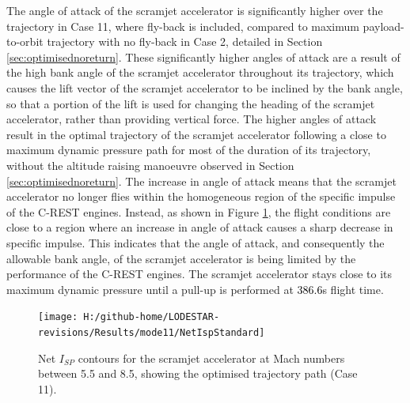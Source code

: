 The angle of attack of the scramjet accelerator is significantly higher over the trajectory in Case 11, where fly-back is included, compared to maximum payload-to-orbit trajectory with no fly-back in Case 2, detailed in Section \ref{sec:optimisednoreturn}. These significantly  higher angles of attack are a result of the high bank angle of the scramjet accelerator throughout its trajectory, which causes the lift vector of the scramjet accelerator to be inclined by the bank angle, so that a portion of the lift is used for changing the heading of the scramjet accelerator, rather than providing vertical force. 
 The higher angles of attack result in the optimal trajectory of the scramjet accelerator following a close to maximum dynamic pressure path for most of the duration of its trajectory, without the altitude raising manoeuvre observed in Section \ref{sec:optimisednoreturn}.
 The increase in angle of attack means that the scramjet accelerator no longer flies within the homogeneous region of the specific impulse of the C-REST engines. Instead, as shown in Figure \ref{fig:NetIspStandard}, the flight conditions are close to a region where an increase in angle of attack causes a sharp decrease in specific impulse. 
This indicates that the angle of attack, and consequently the allowable bank angle, of the scramjet accelerator is being limited by the performance of the C-REST engines. 
 The scramjet accelerator stays close to its maximum dynamic pressure until a pull-up is performed at \textcolor{black}{386.6}s flight time. 
 \begin{figure}[!ht]%
 	\centering
 	\texttt{[image: H:/github-home/LODESTAR-revisions/Results/mode11/NetIspStandard]}
 	\caption{Net $I_{SP}$ contours for the scramjet accelerator at Mach numbers between 5.5 and 8.5, showing the optimised trajectory path (Case 11). }
 	\label{fig:NetIspStandard}
 \end{figure}

